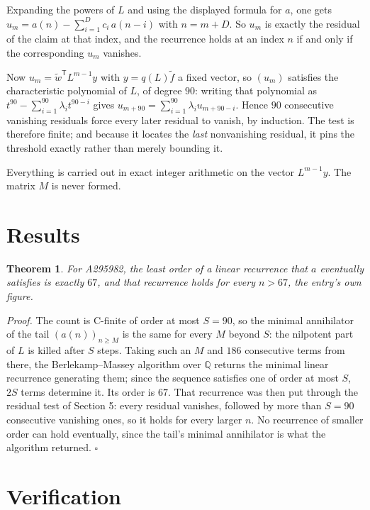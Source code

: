\documentclass[11pt]{article}
\newtheorem{theorem}{Theorem}
\theoremstyle{definition}
\begin{document}
Expanding the powers of $L$ and using the displayed formula for $a$, one gets $u_m = a(n) - \sum_{i=1}^{D} c_i\,a(n-i)$ with $n = m + D$. So $u_m$ is exactly the residual of the claim at that index, and the recurrence holds at an index $n$ if and only if the corresponding $u_m$ vanishes.

Now $u_m = \tilde w^{\mathsf T} L^{m-1} y$ with $y = q(L)\tilde f$ a fixed vector, so $(u_m)$ satisfies the characteristic polynomial of $L$, of degree $90$: writing that polynomial as $t^{90} - \sum_{i=1}^{90} \lambda_i t^{90-i}$ gives $u_{m+90} = \sum_{i=1}^{90} \lambda_i u_{m+90-i}$. Hence $90$ consecutive vanishing residuals force every later residual to vanish, by induction. The test is therefore finite; and because it locates the {\itshape last} nonvanishing residual, it pins the threshold exactly rather than merely bounding it.

Everything is carried out in exact integer arithmetic on the vector $L^{m-1}y$. The matrix $M$ is never formed.

\section{Results}

\begin{theorem} For A295982, the least order of a linear recurrence that $a$ eventually satisfies is exactly $67$, and that recurrence holds for every $n > 67$, the entry's own figure.\end{theorem}

{\itshape Proof.} The count is C-finite of order at most $S = 90$, so the minimal annihilator of the tail $(a(n))_{n \ge M}$ is the same for every $M$ beyond $S$: the nilpotent part of $L$ is killed after $S$ steps. Taking such an $M$ and $186$ consecutive terms from there, the Berlekamp--Massey algorithm over $\mathbb{Q}$ returns the minimal linear recurrence generating them; since the sequence satisfies one of order at most $S$, $2S$ terms determine it. Its order is $67$. That recurrence was then put through the residual test of Section 5: every residual vanishes, followed by more than $S = 90$ consecutive vanishing ones, so it holds for every larger $n$. No recurrence of smaller order can hold eventually, since the tail's minimal annihilator is what the algorithm returned. $\square$

\section{Verification}
\end{document}
